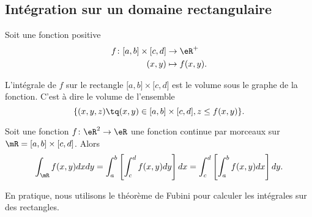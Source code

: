 \subsection{Intégration sur un domaine rectangulaire}
\label{PgRapIntMultFubiniRect}

Soit une fonction positive
\begin{equation}
    \begin{aligned}
        f\colon \mathopen[ a , b \mathclose]\times\mathopen[ c , d \mathclose]&\to \eR^+ \\
        (x,y)&\mapsto f(x,y). 
    \end{aligned}
\end{equation}

L'intégrale de $f$ sur le rectangle $\mathopen[ a , b \mathclose]\times\mathopen[ c , d \mathclose]$ est le volume sous le graphe de la fonction. C'est à dire le volume de l'ensemble
\begin{equation}
    \{ (x,y,z)\tq (x,y)\in\mathopen[ a , b \mathclose]\times\mathopen[ c , d \mathclose], z\leq f(x,y) \}.
\end{equation}

\begin{theorem}
    Soit une fonction $f\colon \eR^2\to \eR$ une fonction continue par morceaux sur $\mR=\mathopen[ a , b \mathclose]\times\mathopen[ c , d \mathclose]$. Alors
    \begin{equation}
        \int_{\mR}f(x,y)dxdy=\int_a^b\left[ \int_c^df(x,y)dy \right]dx=\int_c^d\left[ \int_a^bf(x,y)dx \right]dy.
    \end{equation}
\end{theorem}

En pratique, nous utilisons le théorème de Fubini pour calculer les intégrales sur des rectangles.

